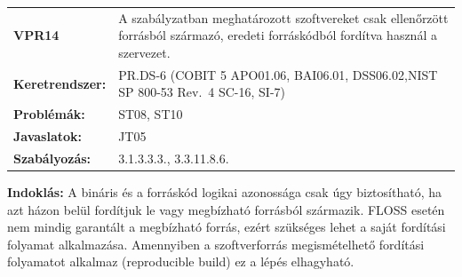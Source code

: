 \documentclass[12pt,magyar,a4paper,oneside]{scrreprt}
\begin{document}
\begin{longtable}[]{@{}ll@{}}
\toprule
\endhead
\begin{minipage}[t]{0.16\columnwidth}\raggedright
\textbf{VPR14}\strut
\end{minipage} & \begin{minipage}[t]{0.79\columnwidth}\raggedright
A szabályzatban meghatározott szoftvereket csak ellenőrzött forrásból
származó, eredeti forráskódból fordítva használ a szervezet.\strut
\end{minipage}\tabularnewline
\begin{minipage}[t]{0.16\columnwidth}\raggedright
\textbf{Keretrendszer:}\strut
\end{minipage} & \begin{minipage}[t]{0.79\columnwidth}\raggedright
PR.DS-6 (COBIT 5 APO01.06, BAI06.01, DSS06.02,NIST SP 800-53 Rev.~4
SC-16, SI-7)\strut
\end{minipage}\tabularnewline
\begin{minipage}[t]{0.16\columnwidth}\raggedright
\textbf{Problémák:}\strut
\end{minipage} & \begin{minipage}[t]{0.79\columnwidth}\raggedright
ST08, ST10\strut
\end{minipage}\tabularnewline
\begin{minipage}[t]{0.16\columnwidth}\raggedright
\textbf{Javaslatok:}\strut
\end{minipage} & \begin{minipage}[t]{0.79\columnwidth}\raggedright
JT05\strut
\end{minipage}\tabularnewline
\begin{minipage}[t]{0.16\columnwidth}\raggedright
\textbf{Szabályozás:}\strut
\end{minipage} & \begin{minipage}[t]{0.79\columnwidth}\raggedright
3.1.3.3.3., 3.3.11.8.6.\strut
\end{minipage}\tabularnewline
\bottomrule
\end{longtable}

\textbf{Indoklás: } A bináris és a forráskód logikai azonossága csak úgy
biztosítható, ha azt házon belül fordítjuk le vagy megbízható forrásból
származik. FLOSS esetén nem mindig garantált a megbízható forrás, ezért
szükséges lehet a saját fordítási folyamat alkalmazása. Amennyiben a
szoftverforrás megismételhető fordítási folyamatot alkalmaz
(reproducible build) ez a lépés elhagyható.
\end{document}
